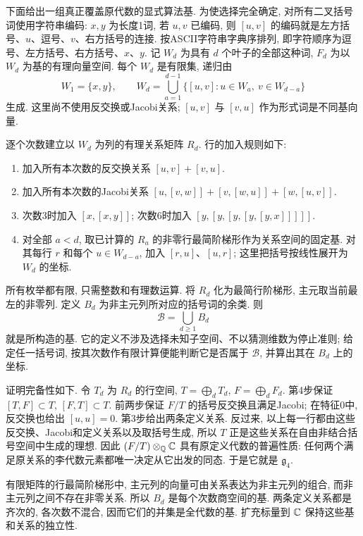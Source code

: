 \begin{solution}
下面给出一组真正覆盖原代数的显式算法基. 为使选择完全确定, 对所有二叉括号词使用字符串编码: $x,y$ 为长度1词, 若 $u,v$ 已编码, 则 $[u,v]$ 的编码就是左方括号、$u$、逗号、$v$、右方括号的连接. 按ASCII字符串字典序排列, 即字符顺序为逗号、左方括号、右方括号、$x$、$y$. 记 $W_d$ 为具有 $d$ 个叶子的全部这种词, $F_d$ 为以 $W_d$ 为基的有理向量空间. 每个 $W_d$ 是有限集, 递归由
\[
W_1=\{x,y\},\qquad
W_d=\bigcup_{a=1}^{d-1}\{[u,v]:u\in W_a,\ v\in W_{d-a}\}
\]
生成. 这里尚不使用反交换或Jacobi关系; $[u,v]$ 与 $[v,u]$ 作为形式词是不同基向量.

逐个次数建立以 $W_d$ 为列的有理关系矩阵 $R_d$. 行的加入规则如下:
\begin{enumerate}[label=\arabic*.]
\item 加入所有本次数的反交换关系 $[u,v]+[v,u]$.
\item 加入所有本次数的Jacobi关系 $[u,[v,w]]+[v,[w,u]]+[w,[u,v]]$.
\item 次数3时加入 $[x,[x,y]]$; 次数6时加入 $[y,[y,[y,[y,[y,x]]]]]$.
\item 对全部 $a<d$, 取已计算的 $R_a$ 的非零行最简阶梯形作为关系空间的固定基. 对其每行 $r$ 和每个 $u\in W_{d-a}$, 加入 $[r,u]$、$[u,r]$; 这里把括号按线性展开为 $W_d$ 的坐标.
\end{enumerate}
所有枚举都有限, 只需整数和有理数运算. 将 $R_d$ 化为最简行阶梯形, 主元取当前最左的非零列. 定义 $B_d$ 为非主元列所对应的括号词的余类. 则
\[
\mathcal B=\bigcup_{d\ge1}B_d
\]
就是所构造的基. 它的定义不涉及选择未知子空间、不以猜测维数为停止准则; 给定任一括号词, 按其次数作有限计算便能判断它是否属于 $\mathcal B$, 并算出其在 $B_d$ 上的坐标.

证明完备性如下. 令 $T_d$ 为 $R_d$ 的行空间, $T=\bigoplus_dT_d$, $F=\bigoplus_dF_d$. 第4步保证 $[T,F]\subset T$, $[F,T]\subset T$. 前两步保证 $F/T$ 的括号反交换且满足Jacobi; 在特征0中, 反交换也给出 $[u,u]=0$. 第3步给出两条定义关系. 反过来, 以上每一行都由这些反交换、Jacobi和定义关系以及取括号生成, 所以 $T$ 正是这些关系在自由非结合括号空间中生成的理想. 因此 $(F/T)\otimes_\mathbb Q\mathbb C$ 具有原定义代数的普遍性质: 任何两个满足原关系的李代数元素都唯一决定从它出发的同态. 于是它就是 $\mathfrak g_4$.

有限矩阵的行最简阶梯形中, 主元列的向量可由关系表达为非主元列的组合, 而非主元列之间不存在非零关系. 所以 $B_d$ 是每个次数商空间的基. 两条定义关系都是齐次的, 各次数不混合, 因而它们的并集是全代数的基. 扩充标量到 $\mathbb C$ 保持这些基和关系的独立性.


\end{solution}
